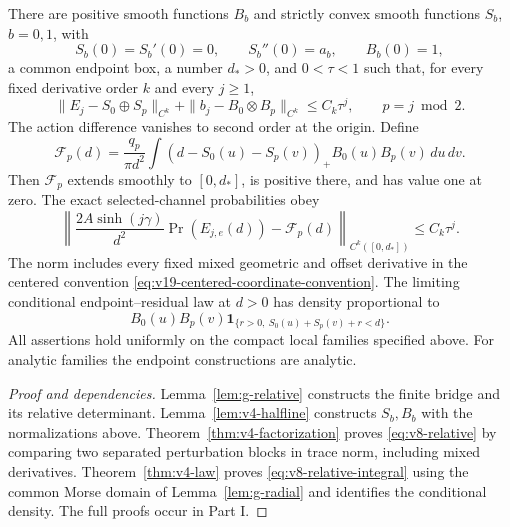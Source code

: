 \begin{theorem}\label{thm:v8-main-relative}
There are positive smooth functions $B_b$ and strictly convex smooth
functions $S_b$, $b=0,1$, with
\[
 S_b(0)=S_b'(0)=0,\qquad S_b''(0)=a_b,\qquad B_b(0)=1,
\]
a common endpoint box, a number $d_*>0$, and $0<\tau<1$ such that, for
every fixed derivative order $k$ and every $j\ge1$,
\begin{equation}\label{eq:v8-relative}
 \|E_j-S_0\oplus S_p\|_{C^k}
 +\|b_j-B_0\otimes B_p\|_{C^k}\le C_k\tau^j,
 \qquad p=j\bmod2.
\end{equation}
The action difference vanishes to second order at the origin. Define
\begin{equation}\label{eq:v8-boundary-integral}
 \mathcal F_p(d)=\frac{q_p}{\pi d^2}
 \int(d-S_0(u)-S_p(v))_+B_0(u)B_p(v)\,du\,dv.
\end{equation}
Then $\mathcal F_p$ extends smoothly to $[0,d_*]$, is positive there,
and has value one at zero. The exact selected-channel probabilities obey
\begin{equation}\label{eq:v8-relative-integral}
 \left\|\frac{2A\sinh(j\gamma)}{d^2}\Pr(E_{j,e}(d))
 -\mathcal F_p(d)\right\|_{C^k([0,d_*])}\le C_k\tau^j.
\end{equation}
The norm includes every fixed mixed geometric and offset derivative in the
centered convention \eqref{eq:v19-centered-coordinate-convention}. The
limiting conditional endpoint--residual law at $d>0$ has density
proportional to
\[
 B_0(u)B_p(v)\mathbf 1_{\{r>0,\ S_0(u)+S_p(v)+r<d\}}.
\]
All assertions hold uniformly on the compact local families specified
above. For analytic families the endpoint constructions are analytic.
\end{theorem}

\begin{proof}[Proof and dependencies]
Lemma~\ref{lem:g-relative} constructs the finite bridge and its relative
determinant. Lemma~\ref{lem:v4-halfline} constructs $S_b,B_b$ with the
normalizations above. Theorem~\ref{thm:v4-factorization} proves
\eqref{eq:v8-relative} by comparing two separated perturbation blocks in
trace norm, including mixed derivatives. Theorem~\ref{thm:v4-law} proves
\eqref{eq:v8-relative-integral} using the common Morse domain of
Lemma~\ref{lem:g-radial} and identifies the conditional density. The full
proofs occur in Part I.
\end{proof}
